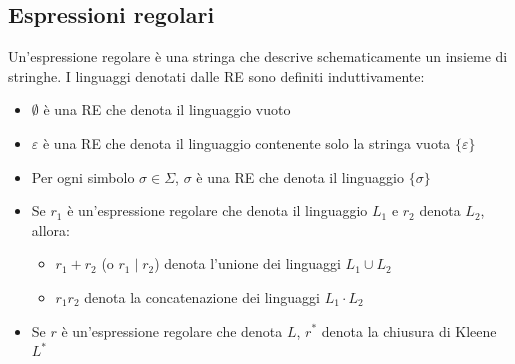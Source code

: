 \documentclass[12pt, a4paper]{report}
\begin{document}
            \subsection{Espressioni regolari}
                \begin{definitionbox}{}{}
                    Un'espressione regolare è una stringa che descrive schematicamente un insieme di stringhe. I linguaggi denotati dalle RE sono definiti induttivamente: 
                    \begin{itemize}
                        \item $\emptyset$ è una RE che denota il linguaggio vuoto
                        \item $\varepsilon$ è una RE che denota il linguaggio contenente solo la stringa vuota $\{\varepsilon\}$
                        \item Per ogni simbolo $\sigma\in\Sigma$, $\sigma$ è una RE che denota il linguaggio $\{\sigma\}$
                        \item Se $r_1$ è un'espressione regolare che denota il linguaggio $L_1$ e $r_2$ denota $L_2$, allora: \begin{itemize}
                            \item $r_1+r_2$ (o $r_1\mid r_2$) denota l'unione dei linguaggi $L_1\cup L_2$
                            \item $r_1r_2$ denota la concatenazione dei linguaggi $L_1\cdot L_2$
                        \end{itemize}
                        \item Se $r$ è un'espressione regolare che denota $L$, $r^*$ denota la chiusura di Kleene $L^*$
                    \end{itemize}
                \end{definitionbox}
\end{document}
